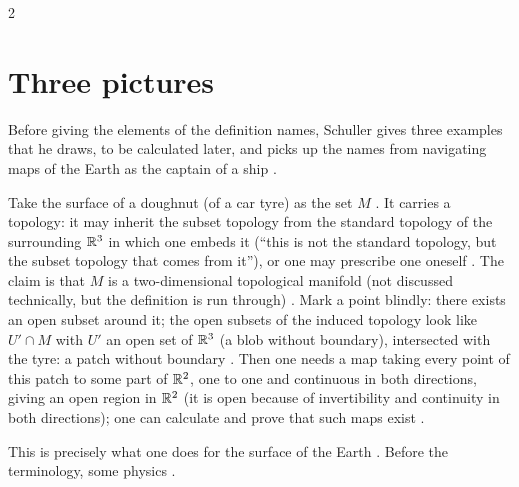 \begin{paracol}{2}
\section{Three pictures}\label{sec:c02-examples}

Before giving the elements of the definition names, Schuller gives three examples that he draws, to be calculated later, and picks up the names from navigating maps of the Earth
as the captain of a ship .

\begin{example}\label{ex:c02-torus}
Take the surface of a doughnut (of a car tyre) as the set $M$ . It carries a topology: it may inherit the subset topology from the
standard topology of the surrounding $\mathbb{R}^3$ in which one embeds it (``this is not the standard topology, but the subset topology that comes from it''), or one may prescribe one oneself
. The claim is that $M$ is a two-dimensional topological manifold (not discussed technically, but the definition is run through)
. Mark a point blindly: there exists an open subset around it; the open subsets of the induced topology look like $U'\cap M$ with $U'$ an open set of $\mathbb{R}^3$
(a blob without boundary), intersected with the tyre: a patch without boundary . Then one needs a map taking every point of this patch to some part
of $\mathbb{R}^2$, one to one and continuous in both directions, giving an open region in $\mathbb{R}^2$ (it is open because of invertibility and continuity in both directions); one can calculate and prove that
such maps exist .
\end{example}
This is precisely what one does for the surface of the Earth . Before the terminology, some physics .


\end{paracol}
